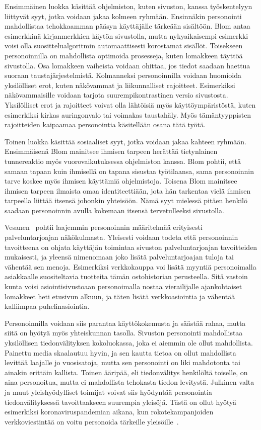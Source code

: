 \documentclass[finnish, 12pt, a4paper, elec, utf8, a-1b, online]{aaltothesis}
\begin{document}
Ensimmäinen luokka käsittää ohjelmiston, kuten sivuston, kanssa työskentelyyn
liittyvät syyt, jotka voidaan jakaa kolmeen ryhmään. Ensinnäkin personointi
mahdollistaa tehokkaamman pääsyn käyttäjälle tärkeään sisältöön. Blom antaa
esimerkkinä kirjanmerkkien käytön sivustolla, mutta nykyaikaisempi esimerkki
voisi olla suosittelualgoritmin automaattisesti korostamat sisällöt. Toisekseen
personoinnilla on mahdollista optimoida prosesseja, kuten lomakkeen täyttöä
sivustolla. Osa lomakkeen vaiheista voidaan ohittaa, jos tiedot saadaan haettua
suoraan taustajärjestelmistä. Kolmanneksi personoinnilla voidaan huomioida
yksilölliset erot, kuten näkövammat ja liikunnalliset rajoitteet. Esimerkiksi
näkövammaisille voidaan tarjota suurempikontrastinen versio sivustosta.
Yksilölliset erot ja rajoitteet voivat olla lähtöisiä myös käyttöympäristöstä,
kuten esimerkiksi kirkas auringonvalo tai voimakas taustahäly. Myös
tämäntyyppisten rajoitteiden kaipaamaa personointia käsitellään osana tätä
työtä.

Toinen luokka käsittää sosiaaliset syyt, jotka voidaan jakaa kahteen ryhmään.
Ensimmäisenä Blom mainitsee ihmisen tarpeen herättää tietynlainen tunnereaktio
myös vuorovaikutuksessa ohjelmiston kanssa. Blom pohtii, että samaan tapaan kuin
ihmisellä on tapana sisustaa työtilaansa, sama personoinnin tarve koskee myös
ihmisen käyttämiä ohjelmistoja. Toisena Blom mainitsee ihmisen tarpeen ilmaista
omaa identiteettiään, jota hän tarkentaa vielä ihmisen tarpeella liittää itsensä
johonkin yhteisöön. Nämä syyt mielessä pitäen henkilö saadaan personoinnin
avulla kokemaan itsensä tervetulleeksi sivustolla.

Vesanen~\cite{10.1108/03090560710737534} pohtii laajemmin personoinnin
määritelmää erityisesti palveluntarjoajan näkökulmasta. Yleisesti voidaan todeta
että personoinnin tavoitteena on ohjata käyttäjän toimintaa sivuston
palveluntarjoajan tavoitteiden mukaisesti, ja yleensä nimenomaan joko lisätä
palveluntarjoajan tuloja tai vähentää sen menoja. Esimerkiksi verkkokauppa voi
lisätä myyntiä personoimalla asiakkaalle suositeltavia tuotteita tämän
ostohistorian perusteella. Sitä vastoin kunta voisi asiointisivustoaan
personoimalla nostaa vierailijalle ajankohtaiset lomakkeet heti etusivun alkuun,
ja täten lisätä verkkoasiointia ja vähentää kalliimpaa puhelinasiointia.

Personoinnilla voidaan siis parantaa käyttökokemusta ja säästää rahaa, mutta
siitä on hyötyä myös yhteiskunnan tasolla. Sivuston personointi mahdollistaa
yksilöllisen tiedonvälityksen kokoluokassa, joka ei aiemmin ole ollut
mahdollista. Painettu media skaalautuu hyvin, ja sen kautta tietoa on ollut
mahdollista levittää laajalle jo vuosisatoja, mutta sen personointi on liki
mahdotonta tai ainakin erittäin kallista. Toinen ääripää, eli tiedonvälitys
henkilöltä toiselle, on aina personoitua, mutta ei mahdollista tehokasta tiedon
levitystä. Julkinen valta ja muut yleishyödylliset toimijat voivat siis
hyödyntää personointia tiedonvälityksessä tavoittaakseen suurempia yleisöjä.
Tästä on ollut hyötyä esimerkiksi koronaviruspandemian aikana, kun
rokotekampanjoiden verkkoviestintää on voitu personoida tärkeille
yleisöille~\cite{sanchez_2022}.
\end{document}

